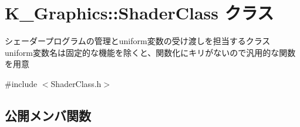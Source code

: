 \hypertarget{class_k___graphics_1_1_shader_class}{}\section{K\+\_\+\+Graphics\+:\+:Shader\+Class クラス}
\label{class_k___graphics_1_1_shader_class}


シェーダープログラムの管理とuniform変数の受け渡しを担当するクラス uniform変数名は固定的な機能を除くと、関数化にキリがないので汎用的な関数を用意  




{\ttfamily \#include $<$Shader\+Class.\+h$>$}

\subsection*{公開メンバ関数}
